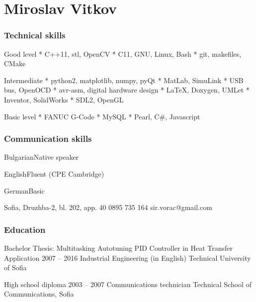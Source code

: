 \documentclass{tccv}
\begin{document}
\part{Miroslav Vitkov}


\section{Technical skills}
\begin{factlist}
\item{Good level}
{
     * C++11, stl, OpenCV                \mynext
     * C11, GNU, Linux, Bash             \mynext
     * git, makefiles, CMake
}

\item{Intermediate}
{
    * python2, matplotlib, numpy, pyQt   \mynext
    * MatLab, SimuLink                   \mynext
    * USB bus, OpenOCD                   \mynext
    * avr-asm, digital hardware design   \mynext
    * LaTeX, Doxygen, UMLet              \mynext
    * Inventor, SolidWorks               \mynext
    * SDL2, OpenGL
}

\item{Basic level}
{
    * FANUC G-Code                       \mynext
    * MySQL                              \mynext
    * Pearl, C\#, Javascript
}
\end{factlist}


\section{Communication skills}
\begin{factlist}
\item{Bulgarian}{Native speaker}
\item{English}{Fluent (CPE Cambridge)}
\item{German}{Basic}
\end{factlist}


\personal
    {Sofia, Druzhba-2, bl. 202, app. 40}
    {0895 735 164}
    {sir.vorac@gmail.com}


\section{Education}
\begin{yearlist}
\item[Bachelor Thesis:                 \newline
     {\footnotesize Multitasking Autotuning PID Controller in Heat Transfer Application}]
     {2007 -- 2016}
     {Industrial Engineering (in English)}
     {Technical University of Sofia}

\item[High school diploma]{2003 -- 2007}
     {Communications technician}
     {Technical School of Communications, Sofia}
\end{yearlist}
\end{document}
